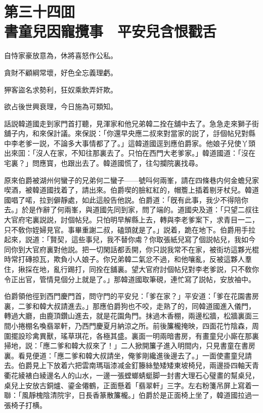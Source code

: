 
\chapter*{第三十四囬　\\書童兒因寵攬事　平安兒含恨戳舌}


\begin{myquote}
自恃家豪放意為，休將喜怒作公私。

貪財不顧綱常壞，好色全忘義理虧。

狎客盜名求勢利，狂奴乘飲弄奸欺。

欲占後世興衰理，今日施為可類知。
\end{myquote}

話説韓道國走到家門首打聽，見渾家和他兄弟韓二拴在舖中去了。急急走來獅子街舖子内，和來保計議。來保説：「你還早央應二叔來對當家的説了，㧱個帖兒對縣中李老爹一説，不論多大事情都了了。」這韓道國逕到應伯爵家。他娘子兒使丫頭出來囬：「沒人在家，不知往那裏去了。只怕在西門大老爹家。」韓道國道：「沒在宅裏？」問應寳，也跟出去了。韓道國慌了，往勾攔院裏找尋。

原來伯爵被湖州何蠻子的兄弟何二蠻子——號呌何兩峯，請在四條巷内何金蟾兒家喫酒，被韓道國找着了，請出來。伯爵喫的臉紅紅的，帽簷上插着剔牙杖兒。韓道國唱了喏，拉到僻靜處，如此這般告他説。伯爵道：「旣有此事，我少不得陪你去。」於是作辭了何兩峯，與道國先同到家，問了端的。道國央及道：「只望二叔往大官府宅裏説説，討個帖兒。只怕明早解縣上去，轉與李老爹案下，求青目一二，只不敎你姪婦見官。事畢重謝二叔，磕頭就是了。」説着，跪在地下。伯爵用手拉起來，説道：「賢契，這些事兒，我不替你䖏？你取張紙兒寫了個説帖兒，我如今同你到大官府裏對他説。把一切閑話都丢開，你只説我常不在家，被街坊這夥光棍時常打磚掠瓦，欺負小人娘子。你兄弟韓二氣忿不過，和他嚷亂，反被這夥人羣住，揪採在地，亂行踢打，同拴在舖裏。望大官府討個帖兒對李老爹説，只不敎你令正出官，管情見個分上就是了。」那韓道國取筆硯，連忙寫了説帖，安放袖中。

伯爵領他徑到西門慶門首，問守門的平安兒：「爹在家？」平安道：「爹在花園書房裏，二爹和韓大叔請進去。」那應伯爵狗也不咬，走熟了的，同韓道國進入儀門，轉過大廳，由鹿頂鑽山進去，就是花園角門。抹過木香棚，兩邊松牆，松牆裏面三間小捲棚名喚翡翠軒，乃西門慶夏月納涼之所。前後簾櫳掩映，四面花竹陰森，周圍擺設珍禽異獸，瑤草琪花，各極其盛。裏面一明兩暗書房，有畫童兒小廝在那裏掃地，説：「應二爹和韓大叔來了！」二人掀開簾子進入明間内，只見書童在書房裏。看見便道：「應二爹和韓大叔請坐，俺爹剛纔進後邊去了。」一面使畫童兒請去。伯爵見上下放着六把雲南瑪瑙漆减金釘籐絲墊矮矮東坡椅兒，兩邊掛四軸天青衢花綾裱白綾邊名人的山水，一邊一張螳螂蜻蜓脚一封書大理石心璧畫的幫桌兒，桌兒上安放古銅爐、鎏金僊鶴，正面懸着「翡翠軒」三字。左右粉箋吊屏上寫着一聯：「風靜槐陰清院宇，日長香篆散簾櫳。」伯爵於是正面椅上坐了，韓道國拉過一張椅子打横。

